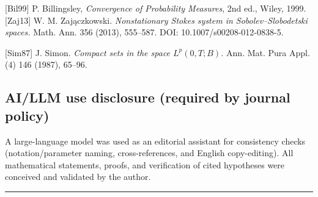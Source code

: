\documentclass[
  11pt,
]{article}
\begin{document}
{[}Bil99{]} P. Billingsley, \emph{Convergence of Probability Measures}, 2nd ed., Wiley, 1999. {[}Zaj13{]} W. M. Zajączkowski. \emph{Nonstationary Stokes system in Sobolev--Slobodetski spaces.} Math. Ann. 356 (2013), 555--587. DOI: 10.1007/s00208-012-0838-5.

{[}Sim87{]} J. Simon. \emph{Compact sets in the space \(L^p(0,T;B)\).} Ann. Mat. Pura Appl. (4) 146 (1987), 65--96.

\hypertarget{aillm-use-disclosure-required-by-journal-policy}{%
\subsection{AI/LLM use disclosure (required by journal policy)}\label{aillm-use-disclosure-required-by-journal-policy}}

A large-language model was used as an editorial assistant for consistency checks (notation/parameter naming, cross-references, and English copy-editing). All mathematical statements, proofs, and verification of cited hypotheses were conceived and validated by the author.

\begin{center}\rule{0.5\linewidth}{0.5pt}\end{center}
\end{document}
